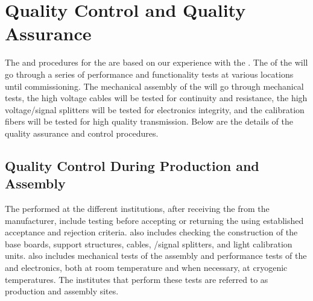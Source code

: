 \section{Quality Control and Quality Assurance}
\label{sec:dp-pds-quality}

The  and  procedures for the \dual {} are based on our experience with the . The  of the \dual {} will go through a series of performance and functionality tests at various locations until commissioning. The mechanical assembly of the  will go through mechanical tests, the high voltage cables will be tested for continuity and resistance, the high voltage/signal splitters will be tested for electronics integrity, and the calibration fibers will be tested for high quality transmission. Below  are the details of the quality assurance and control procedures.

\subsection{Quality Control During Production and Assembly}

The  performed at the different institutions, after receiving the  from the manufacturer, include  testing before accepting or returning the  using established acceptance and rejection criteria.  also includes checking the construction of the base boards, support structures, cables, /signal splitters, and light calibration units.  also includes mechanical tests of the assembly and performance tests of the  and electronics, both at room temperature and when necessary, at cryogenic temperatures. The institutes that perform these tests are referred to as production and assembly sites.

